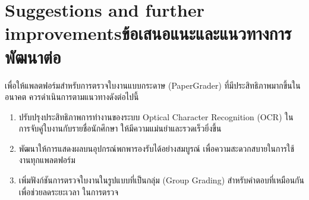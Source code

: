 \section{\ifenglish Suggestions and further improvements\else ข้อเสนอแนะและแนวทางการพัฒนาต่อ\fi}
  \qquad เพื่อให้แพลตฟอร์มสำหรับการตรวจใบงานแบบกระดาษ (PaperGrader) ที่มีประสิทธิภาพมากขึ้นในอนาคต
  ควรดําเนินการตามแนวทางดังต่อไปนี้
  \begin{enumerate}
    \item ปรับปรุงประสิทธิภาพการทำงานของระบบ Optical Character Recognition (OCR) ในการจับคู่ใบงานกับรายชื่อนักศึกษา
    ให้มีความแม่นยำและรวดเร็วยิ่งขึ้น
    \item พัฒนาให้การแสดงผลบนอุปกรณ์พกพารองรับได้อย่างสมบูรณ์ เพื่อความสะดวกสบายในการใช้งานทุกแพลตฟอร์ม
    \item เพิ่มฟังก์ชันการตรวจใบงานในรูปแบบที่เป็นกลุ่ม (Group Grading) สำหรับคำตอบที่เหมือนกัน เพื่อช่วยลดระยะเวลา
    ในการตรวจ
  \end{enumerate}